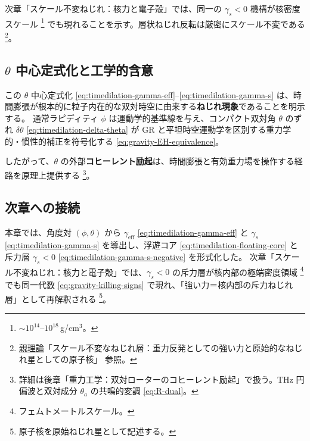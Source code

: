 \documentclass[dvipdfmx,a4paper,oneside]{jsbook}
\numberwithin{equation}{chapter}
\begin{document}
次章「スケール不変ねじれ：核力と電子殻」では、同一の \(\gamma_s < 0\) 機構が核密度スケール \footnote{\(\sim 10^{14}\)–\(10^{18}\)\,g/cm\(^3\)。} でも現れることを示す。層状ねじれ反転は厳密にスケール不変である \footnote{\hyperref[sec:sister-manuscripts]{親理論}「スケール不変なねじれ層：重力反発としての強い力と原始的なねじれ星としての原子核」 参照。}。

\subsection{\(\theta\) 中心定式化と工学的含意}

この \(\theta\) 中心定式化 \eqref{eq:timedilation-gamma-eff}–\eqref{eq:timedilation-gamma-s} は、時間膨張が根本的に粒子内在的な双対時空に由来する\textbf{ねじれ現象}であることを明示する。
通常ラピディティ \(\phi\) は運動学的基準線を与え、コンパクト双対角 \(\theta\) のずれ \(\delta\theta\) \eqref{eq:timedilation-delta-theta} が GR と平坦時空運動学を区別する重力学的・慣性的補正を符号化する \eqref{eq:gravity-EH-equivalence}。

したがって、\(\theta\) の外部\textbf{コヒーレント励起}は、時間膨張と有効重力場を操作する経路を原理上提供する \footnote{詳細は後章「重力工学：双対ローターのコヒーレント励起」で扱う。THz 円偏波と双対成分 \(\theta_a\) の共鳴的変調 \eqref{eq:R-dual}。}。

\subsection{次章への接続}

本章では、角度対 \((\phi, \theta)\) から \(\gamma_{\mathrm{eff}}\) \eqref{eq:timedilation-gamma-eff} と \(\gamma_s\) \eqref{eq:timedilation-gamma-s} を導出し、浮遊コア \eqref{eq:timedilation-floating-core} と斥力層 \(\gamma_s < 0\) \eqref{eq:timedilation-gamma-s-negative} を形式化した。
次章「スケール不変ねじれ：核力と電子殻」では、\(\gamma_s < 0\) の斥力層が核内部の極端密度領域 \footnote{フェムトメートルスケール。} でも同一代数 \eqref{eq:gravity-killing-signs} で現れ、「強い力＝核内部の斥力ねじれ層」として再解釈される \footnote{原子核を原始ねじれ星として記述する。}。
\end{document}
